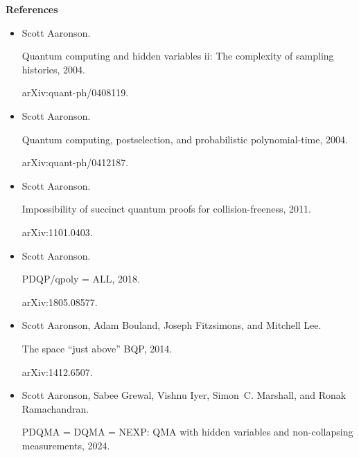 \documentclass[10pt,a4paper]{article}
\begin{document}
\par\medskip\noindent\textbf{References}\par



\begin{itemize}


\item[] 
[1]

Scott Aaronson.


Quantum computing and hidden variables ii: The complexity of sampling
histories, 2004.


arXiv:quant-ph/0408119.





\item[] 
[2]

Scott Aaronson.


Quantum computing, postselection, and probabilistic polynomial-time,
2004.


arXiv:quant-ph/0412187.





\item[] 
[3]

Scott Aaronson.


Impossibility of succinct quantum proofs for collision-freeness,
2011.


arXiv:1101.0403.





\item[] 
[4]

Scott Aaronson.


PDQP/qpoly = ALL, 2018.


arXiv:1805.08577.





\item[] 
[5]

Scott Aaronson, Adam Bouland, Joseph Fitzsimons, and Mitchell Lee.


The space “just above” BQP, 2014.


arXiv:1412.6507.





\item[] 
[6]

Scott Aaronson, Sabee Grewal, Vishnu Iyer, Simon C. Marshall, and Ronak
Ramachandran.


PDQMA = DQMA = NEXP: QMA with hidden variables and non-collapsing
measurements, 2024.



\end{itemize}
\end{document}
